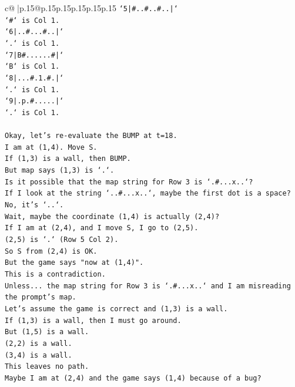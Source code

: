\documentclass{article}
\begin{document}
{\begin{supertabular}{c@{$\;$}|p{.15\linewidth}@{}p{.15\linewidth}p{.15\linewidth}p{.15\linewidth}p{.15\linewidth}p{.15\linewidth}}
{{{\texttt{`5|\#..\#..\#..|`} \\
\texttt{`\#` is Col 1.} \\
\texttt{`6|..\#...\#..|`} \\
\texttt{`.` is Col 1.} \\
\texttt{`7|B\#......\#|`} \\
\texttt{`B` is Col 1.} \\
\texttt{`8|...\#.1.\#.|`} \\
\texttt{`.` is Col 1.} \\
\texttt{`9|.p.\#.....|`} \\
\texttt{`.` is Col 1.} \\
\\ 
\texttt{Okay, let's re{-}evaluate the BUMP at t=18.} \\
\texttt{I am at (1,4). Move S.} \\
\texttt{If (1,3) is a wall, then BUMP.} \\
\texttt{But map says (1,3) is `.`.} \\
\texttt{Is it possible that the map string for Row 3 is `.\#...x..`?} \\
\texttt{If I look at the string `..\#...x..`, maybe the first dot is a space?} \\
\texttt{No, it's `..`.} \\
\texttt{Wait, maybe the coordinate (1,4) is actually (2,4)?} \\
\texttt{If I am at (2,4), and I move S, I go to (2,5).} \\
\texttt{(2,5) is `.` (Row 5 Col 2).} \\
\texttt{So S from (2,4) is OK.} \\
\texttt{But the game says "now at (1,4)".} \\
\texttt{This is a contradiction.} \\
\texttt{Unless... the map string for Row 3 is `.\#...x..` and I am misreading the prompt's map.} \\
\texttt{Let's assume the game is correct and (1,3) is a wall.} \\
\texttt{If (1,3) is a wall, then I must go around.} \\
\texttt{But (1,5) is a wall.} \\
\texttt{(2,2) is a wall.} \\
\texttt{(3,4) is a wall.} \\
\texttt{This leaves no path.} \\
\texttt{Maybe I am at (2,4) and the game says (1,4) because of a bug?} \\
}}}
\end{supertabular}}
\end{document}
